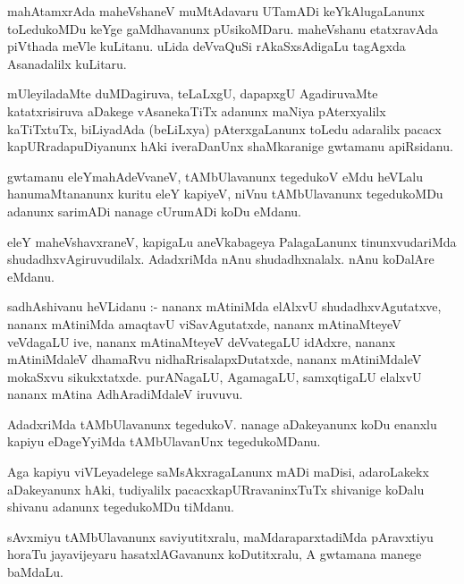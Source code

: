 \documentclass{article}
\begin{document}
\begin{mn}
mahAtamxrAda  maheVshaneV  muMtAdavaru  UTamADi  keYkAlugaLanunx  toLedukoMDu  keYge  gaMdhavanunx  
pUsikoMDaru.  maheVshanu  etatxravAda  piVthada  meVle  kuLitanu.  uLida  deVvaQuSi  rAkaSxsAdigaLu  
tagAgxda  Asanadalilx  kuLitaru.
\end{mn}

\begin{mn}
mUleyiladaMte  duMDagiruva,  teLaLxgU,  dapapxgU  AgadiruvaMte  katatxrisiruva  aDakege  vAsanekaTiTx  
adanunx  maNiya  pAterxyalilx  kaTiTxtuTx,  biLiyadAda (beLiLxya)  pAterxgaLanunx  toLedu  adaralilx  
pacacx kapURradapuDiyanunx  hAki  iveraDanUnx  shaMkaranige  gwtamanu  apiRsidanu.
\end{mn}

\begin{mn}
gwtamanu  eleYmahAdeVvaneV,  tAMbUlavanunx  tegedukoV  eMdu  heVLalu  hanumaMtananunx  kuritu  
eleY  kapiyeV,  niVnu  tAMbUlavanunx  tegedukoMDu  adanunx  sarimADi  nanage  cUrumADi  koDu  eMdanu.
\end{mn}

\begin{mn}
eleY  maheVshavxraneV,  kapigaLu  aneVkabageya  PalagaLanunx  tinunxvudariMda  shudadhxvAgiruvudilalx.  
AdadxriMda  nAnu  shudadhxnalalx.  nAnu  koDalAre  eMdanu.
\end{mn}

\begin{mn}
sadhAshivanu  heVLidanu :- nananx  mAtiniMda  elAlxvU  shudadhxvAgutatxve,  nananx  mAtiniMda  amaqtavU  
viSavAgutatxde,  nananx  mAtinaMteyeV  veVdagaLU  ive,  nananx  mAtinaMteyeV  deVvategaLU  idAdxre,  
nananx  mAtiniMdaleV  dhamaRvu  nidhaRrisalapxDutatxde,  nananx  mAtiniMdaleV  mokaSxvu  sikukxtatxde.  
purANagaLU,  AgamagaLU,  samxqtigaLU  elalxvU  nananx  mAtina  AdhAradiMdaleV  iruvuvu.
\end{mn}

\begin{mn}
AdadxriMda  tAMbUlavanunx  tegedukoV.  nanage  aDakeyanunx  koDu  enanxlu  kapiyu  eDageYyiMda  
tAMbUlavanUnx  tegedukoMDanu.
\end{mn}

\begin{mn}
Aga  kapiyu  viVLeyadelege  saMsAkxragaLanunx  mADi  maDisi,  adaroLakekx  aDakeyanunx  hAki, 
tudiyalilx  pacacxkapURravaninxTuTx  shivanige  koDalu  shivanu  adanunx  tegedukoMDu  tiMdanu.
\end{mn}

\begin{mn}
sAvxmiyu  tAMbUlavanunx  saviyutitxralu,  maMdaraparxtadiMda  pAravxtiyu  horaTu  jayavijeyaru  
hasatxlAGavanunx  koDutitxralu,  A  gwtamana  manege  baMdaLu.
\end{mn}
\end{document}
